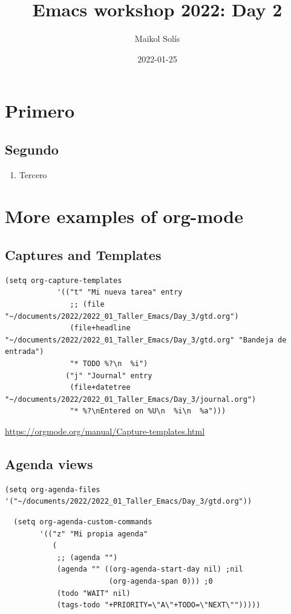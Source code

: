\documentclass[11pt]{article}
\author{Maikol Solís}
\date{2022-01-25}
\title{Emacs workshop 2022: Day 2}
\begin{document}
\section{Primero}
\label{sec:orgfa9dcad}
\subsection{Segundo}
\label{sec:org39abc7e}
\begin{enumerate}
\item Tercero
\label{sec:orga3599a8}
\end{enumerate}

\section{More examples of org-mode}
\label{sec:orgaf866f5}

\subsection{Captures and Templates}
\label{sec:org5730ff2}
\begin{verbatim}
(setq org-capture-templates
            '(("t" "Mi nueva tarea" entry
               ;; (file "~/documents/2022/2022_01_Taller_Emacs/Day_3/gtd.org")
               (file+headline "~/documents/2022/2022_01_Taller_Emacs/Day_3/gtd.org" "Bandeja de entrada")
               "* TODO %?\n  %i")
              ("j" "Journal" entry
               (file+datetree  "~/documents/2022/2022_01_Taller_Emacs/Day_3/journal.org")
               "* %?\nEntered on %U\n  %i\n  %a")))
\end{verbatim}



\url{https://orgmode.org/manual/Capture-templates.html}

\subsection{Agenda views}
\label{sec:org1bf3789}


\begin{verbatim}
(setq org-agenda-files '("~/documents/2022/2022_01_Taller_Emacs/Day_3/gtd.org"))
\end{verbatim}


\begin{verbatim}
  (setq org-agenda-custom-commands
        '(("z" "Mi propia agenda"
           (
            ;; (agenda "")
            (agenda "" ((org-agenda-start-day nil) ;nil
                        (org-agenda-span 0))) ;0
            (todo "WAIT" nil)
            (tags-todo "+PRIORITY=\"A\"+TODO=\"NEXT\"")))))
\end{verbatim}
\end{document}
